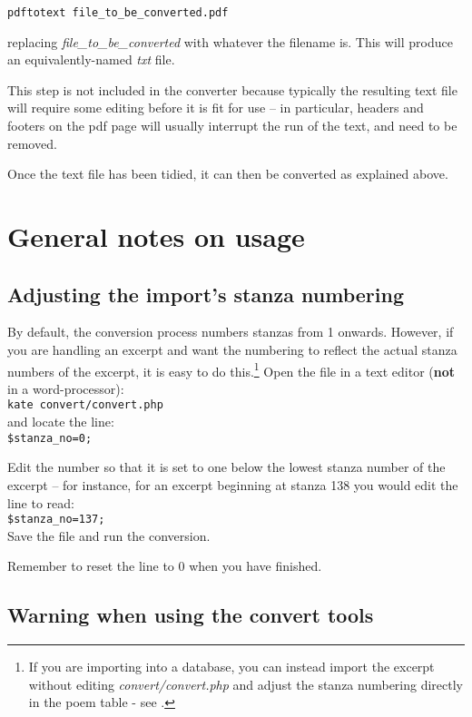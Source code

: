 \verb|pdftotext file_to_be_converted.pdf|

replacing \textit{file\_to\_be\_converted} with whatever the filename is.  This will produce an equivalently-named \textit{txt} file.

This step is not included in the converter because typically the resulting text file will require some editing before it is fit for use -- in particular, headers and footers on the pdf page will usually interrupt the run of the text, and need to be removed.

Once the text file has been tidied, it can then be converted as explained above.


\section{General notes on usage}

\subsection{Adjusting the import's stanza numbering}
\label{ss:stanzano}

By default, the conversion process numbers stanzas from 1 onwards.  However, if you are handling an excerpt and want the numbering to reflect the actual stanza numbers of the excerpt, it is easy to do this.\footnote{If you are importing into a database, you can instead import the excerpt without editing \textit{convert/convert.php} and adjust the stanza numbering directly in the poem table - see .}  Open the file in a text editor (\textbf{not} in a word-processor):\\
\verb|kate convert/convert.php|\\
and locate the line:\\
\verb|$stanza_no=0;|

Edit the number so that it is set to one below the lowest stanza number of the excerpt -- for instance, for an excerpt beginning at stanza 138 you would edit the line to read:\\
\verb|$stanza_no=137;|\\
Save the file and run the conversion.

Remember to reset the line to 0 when you have finished.

\subsection{Warning when using the convert tools}

